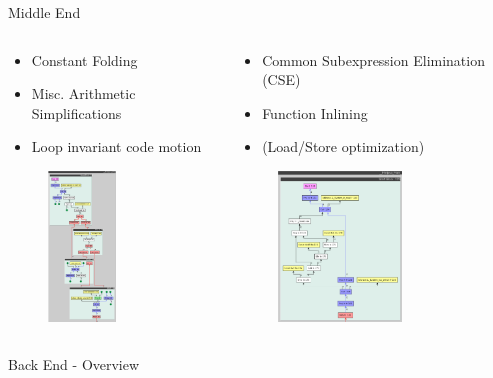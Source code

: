 \documentclass[en,16:9]{sdqbeamer}
\begin{document}
\begin{frame}{Middle End}
	\begin{columns}
		\begin{column}{0.5\linewidth}
			\begin{itemize}
				\item Constant Folding
				\item Misc. Arithmetic Simplifications
				\item Loop invariant code motion
			\end{itemize}%
			
			\begin{figure}
				\centering
				\includegraphics[draft,width=\linewidth,height=4cm]{images/optimization-before.png}
			\end{figure}
		\end{column}
		\begin{column}{0.5\linewidth}
			\begin{itemize}
				\item Common Subexpression Elimination (CSE)
				\item Function Inlining
				\item (Load/Store optimization)
			\end{itemize}
		
			\begin{figure}
				\centering
				\includegraphics[draft,width=\linewidth,height=4cm]{images/optimization-after.png}
			\end{figure}
		\end{column}
	\end{columns}
\end{frame}

\begin{frame}{Back End - Overview}
	
\end{frame}
\end{document}

